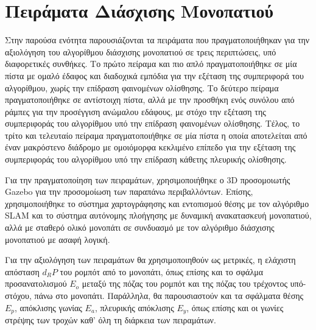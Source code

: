 \section{Πειράματα Διάσχισης Μονοπατιού} \label{sec:path_tracking_experiments}
Στην παρούσα ενότητα παρουσιάζονται τα πειράματα που πραγματοποιήθηκαν για την αξιολόγηση του αλγορίθμου διάσχισης μονοπατιού σε τρεις περιπτώσεις, υπό διαφορετικές συνθήκες. Το πρώτο πείραμα και πιο απλό πραγματοποιήθηκε σε μία πίστα με ομαλό έδαφος και διαδοχικά εμπόδια για την εξέταση της συμπεριφορά του αλγορίθμου, χωρίς την επίδραση φαινομένων ολίσθησης. Το δεύτερο πείραμα πραγματοποιήθηκε σε αντίστοιχη πίστα, αλλά με την προσθήκη ενός συνόλου από ράμπες για την προσέγγιση ανώμαλου εδάφους, με στόχο την εξέταση της συμπεριφοράς του αλγορίθμου υπό την επίδραση φαινομένων ολίσθησης. Τέλος, το τρίτο και τελευταίο πείραμα πραγματοποιήθηκε σε μία πίστα η οποία αποτελείται από έναν μακρόστενο διάδρομο με ομοιόμορφα κεκλιμένο επίπεδο για την εξέταση της συμπεριφοράς του αλγορίθμου υπό την επίδραση κάθετης πλευρικής ολίσθησης.

\bigskip
Για την πραγματοποίηση των πειραμάτων, χρησιμοποιήθηκε ο 3D προσομοιωτής Gazebo για την προσομοίωση των παραπάνω περιβαλλόντων. Επίσης, χρησιμοποιήθηκε το σύστημα χαρτογράφησης και εντοπισμού θέσης με τον αλγόριθμο SLAM και το σύστημα αυτόνομης πλοήγησης με δυναμική ανακατασκευή μονοπατιού, αλλά με σταθερό ολικό μονοπάτι σε συνδυασμό με τον αλγόριθμο διάσχισης μονοπατιού με ασαφή λογική.

\bigskip
Για την αξιολόγηση των πειραμάτων θα χρησιμοποιηθούν ως μετρικές, η ελάχιστη απόσταση $d_RP$ του ρομπότ από το μονοπάτι, όπως επίσης και το σφάλμα προσανατολισμού $E_o$ μεταξύ της πόζας του ρομπότ και της πόζας του τρέχοντος υπό-στόχου, πάνω στο μονοπάτι. Παράλληλα, θα παρουσιαστούν και τα σφάλματα θέσης $E_p$, απόκλισης γωνίας $E_a$, πλευρικής απόκλισης $E_y$, όπως επίσης και οι γωνίες στρέψης των τροχών καθ' όλη τη διάρκεια των πειραμάτων.

